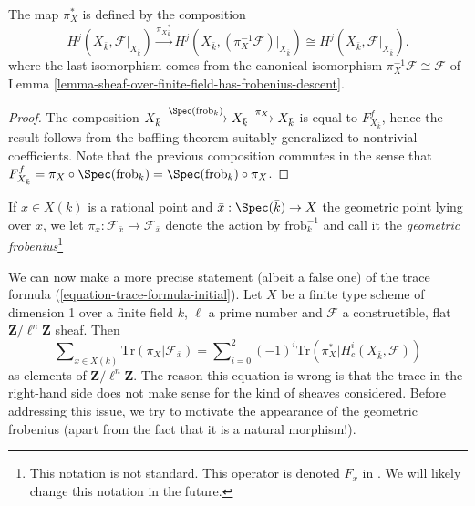 \noindent
The map $\pi_X^*$ is defined by the composition
$$
H^j(X_{\bar k}, \mathcal{F}|_{X_{\bar k}}) \xrightarrow{{\pi_X}_{\bar k}^*}
H^j(X_{\bar k}, (\pi_X^{-1} \mathcal{F})|_{X_{\bar k}}) \cong
H^j(X_{\bar k}, \mathcal{F}|_{X_{\bar k}}).
$$
where the last isomorphism comes from the canonical isomorphism
$\pi_X^{-1} \mathcal{F} \cong \mathcal{F}$ of
Lemma \ref{lemma-sheaf-over-finite-field-has-frobenius-descent}.

\begin{proof}
The composition $X_{\bar k} \xrightarrow{\Spec(\text{frob}_k)} X_{\bar k}
\xrightarrow{\pi_X} X_{\bar k}$ is equal to $F_{X_{\bar k}}^f$, hence the
result follows from the baffling theorem suitably generalized to nontrivial
coefficients. Note that the previous composition commutes in the sense that
$F_{X_{\bar k}}^f = \pi_X \circ \Spec(\text{frob}_k) =
\Spec(\text{frob}_k) \circ \pi_X$.
\end{proof}

\begin{definition}
\label{definition-geometric-frobenius-on-stalk}
If $x \in X(k)$ is a rational point and $\bar x : \Spec(\bar k) \to X$
the geometric point lying over $x$, we let $\pi_x : \mathcal{F}_{\bar x} \to
\mathcal{F}_{\bar x}$ denote the action by $\text{frob}_k^{-1}$ and call it the
{\it geometric frobenius}\footnote{This notation is not standard.
This operator is denoted $F_x$ in \cite{SGA4.5}. We will likely change
this notation in the future.}
\end{definition}

\noindent
We can now make a more precise statement (albeit a false one) of the trace
formula (\ref{equation-trace-formula-initial}). Let $X$ be a finite
type scheme of dimension 1
over a finite field $k$, $\ell$ a prime number and $\mathcal{F}$ a
constructible, flat $\mathbf{Z}/\ell^n\mathbf{Z}$ sheaf. Then
\begin{equation}
\label{equation-trace-formula-second}
\sum\nolimits_{x \in X(k)}
\text{Tr}(\pi_X | \mathcal{F}_{\bar x})
=
\sum\nolimits_{i = 0}^2
(-1)^i \text{Tr}(\pi_X^* | H^i_c(X_{\bar k}, \mathcal{F}))
\end{equation}
as elements of $\mathbf{Z}/\ell^n\mathbf{Z}$. The reason this equation is wrong
is that the trace in the right-hand side does not make sense for the kind of
sheaves considered. Before addressing this issue, we try to motivate the
appearance of the geometric frobenius (apart from the fact that it is a natural
morphism!).

